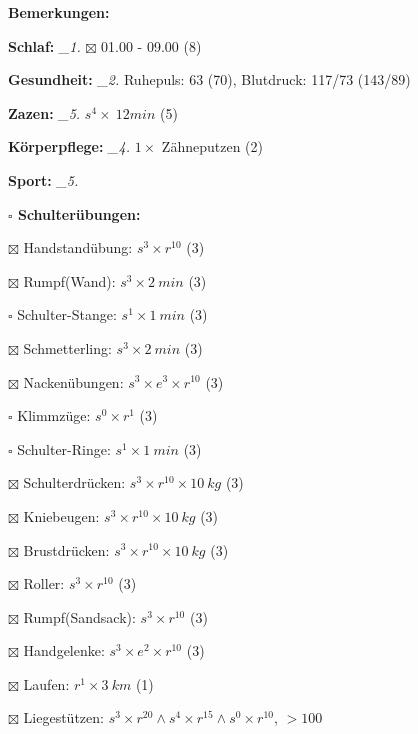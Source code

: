 \documentclass[10pt,a4paper]{article}
\newcommand\prop[1] {{\color {alizarin} {\bf #1}}}             %
\newcommand\mand[1] {{\color {burntorange} {\bf #1}}}          %
\newcommand\topspace{\vskip -15pt \hskip 20pt}
\newcommand\n[1] { {\sl #1.} \hskip 5pt }
\begin{document}
\begin{mdframed}[style=daystyle]
  \begin{labeling}{{\mand {Bemerkungen:}}}
    \setlength\itemsep{-3pt}
  \item[{\mand {Schlaf:}}]        \n{\_1} $\boxtimes$ 01.00 - 09.00 (8)
  \item[{\mand {Gesundheit:}}]    \n{\_2} Ruhepuls: 63 (70), Blutdruck: 117/73 (143/89)
  \item[{\mand {Zazen:}}]         \n{\_5} $s^4 \times\ 12 min$ (5)
  \item[{\mand {Körperpflege:}}]  \n{\_4} $1 \times$ Zähneputzen (2)
  \item[{\mand {Sport:}}]         \n{\_5}
    \topspace
    \begin{minipage}{0.75\textwidth}  
      \begin{labeling}{\prop {$\square$ {Schulterübungen:}}} 
        \setlength\itemsep{-3pt}
      \item[$\boxtimes$ Handstandübung:]  $s^3 \times r^{10}$ (3)
      \item[$\boxtimes$ Rumpf(Wand):]     $s^3 \times 2\ min$ (3)
      \item[$\square$ Schulter-Stange:] $s^1 \times 1\ min$ (3)
      \item[$\boxtimes$ Schmetterling:]   $s^3 \times 2\ min$ (3)
      \item[$\boxtimes$ Nackenübungen:]   $s^3 \times e^3 \times r^{10}$ (3)
      \item[$\square$ Klimmzüge:]       $s^0 \times r^1$ (3)
      \item[$\square$ Schulter-Ringe:]  $s^1 \times 1\ min$ (3)
      \item[$\boxtimes$ Schulterdrücken:] $s^3 \times r^{10} \times 10\ kg$ (3)
      \item[$\boxtimes$ Kniebeugen:]      $s^3 \times r^{10} \times 10\ kg$ (3)
      \item[$\boxtimes$ Brustdrücken:]    $s^3 \times r^{10} \times 10\ kg$ (3)
      \item[$\boxtimes$ Roller:]          $s^3 \times r^{10}$ (3)
      \item[$\boxtimes$ Rumpf(Sandsack):] $s^3 \times r^{10}$ (3)
      \item[$\boxtimes$ Handgelenke:]     $s^3 \times e^2 \times r^{10}$ (3)
      \item[$\boxtimes$ Laufen:]          $r^1 \times 3\ km$ (1)
      \item[$\boxtimes$ Liegestützen:]    $s^3 \times r^{20} \land s^4 \times r^{15} \land s^0 \times r^{10}$, $> 100$

\end{labeling}
\end{minipage}
\end{labeling}
\end{mdframed}
\end{document}
